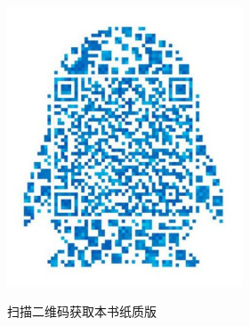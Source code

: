 \begin{center}
	\includegraphics[width=7cm]{../images/0001}
	\begin{center}
		{\LARGE 扫描二维码获取本书纸质版}
	\end{center}
\end{center}
